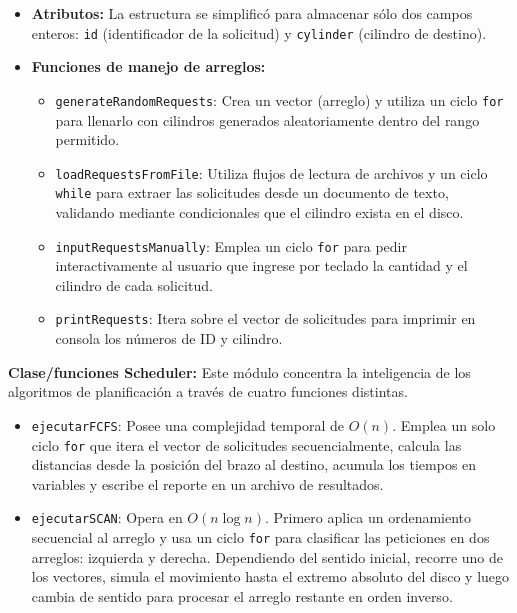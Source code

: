 \documentclass[14pt,letterpaper]{extarticle}
\begin{document}
\begin{itemize}
    \item \textbf{Atributos:} La estructura se simplificó para almacenar sólo dos campos enteros: \texttt{id} (identificador de la solicitud) y \texttt{cylinder} (cilindro de destino).
    \item \textbf{Funciones de manejo de arreglos:}
    \begin{itemize}
        \item \texttt{generateRandomRequests}: Crea un vector (arreglo) y utiliza un ciclo \texttt{for} para llenarlo con cilindros generados aleatoriamente dentro del rango permitido.
        \item \texttt{loadRequestsFromFile}: Utiliza flujos de lectura de archivos y un ciclo \texttt{while} para extraer las solicitudes desde un documento de texto, validando mediante condicionales que el cilindro exista en el disco.
        \item \texttt{inputRequestsManually}: Emplea un ciclo \texttt{for} para pedir interactivamente al usuario que ingrese por teclado la cantidad y el cilindro de cada solicitud.
        \item \texttt{printRequests}: Itera sobre el vector de solicitudes para imprimir en consola los números de ID y cilindro.
    \end{itemize}
\end{itemize}

\textbf{Clase/funciones Scheduler:} Este módulo concentra la inteligencia de los algoritmos de planificación a través de cuatro funciones distintas.

\begin{itemize}
    \item \texttt{ejecutarFCFS}: Posee una complejidad temporal de $O(n)$. Emplea un solo ciclo \texttt{for} que itera el vector de solicitudes secuencialmente, calcula las distancias desde la posición del brazo al destino, acumula los tiempos en variables y escribe el reporte en un archivo de resultados.
    \item \texttt{ejecutarSCAN}: Opera en $O(n \log n)$. Primero aplica un ordenamiento secuencial al arreglo y usa un ciclo \texttt{for} para clasificar las peticiones en dos arreglos: izquierda y derecha. Dependiendo del sentido inicial, recorre uno de los vectores, simula el movimiento hasta el extremo absoluto del disco y luego cambia de sentido para procesar el arreglo restante en orden inverso.
\end{itemize}
\end{document}
